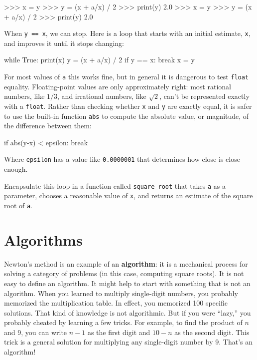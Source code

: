 \beforeverb
\begin{pyinterpreter}
>>> x = y
>>> y = (x + a/x) / 2
>>> print(y)
2.0
>>> x = y
>>> y = (x + a/x) / 2
>>> print(y)
2.0
\end{pyinterpreter}
\afterverb
%
When {\tt y == x}, we can stop.  Here is a loop that starts
with an initial estimate, {\tt x}, and improves it until it
stops changing:

\beforeverb
\begin{pycode}
while True:
    print(x)
    y = (x + a/x) / 2
    if y == x:
        break
    x = y
\end{pycode}
\afterverb
%
For most values of {\tt a} this works fine, but in general it is
dangerous to test {\tt float} equality.
Floating-point values are only approximately right:
most rational numbers, like $1/3$, and irrational numbers, like
$\sqrt{2}$, can't be represented exactly with a {\tt float}.
%
%
Rather than checking whether {\tt x} and {\tt y} are exactly equal, it
is safer to use the built-in function {\tt abs} to compute the
absolute value, or magnitude, of the difference between them:

\beforeverb
\begin{pycode}
    if abs(y-x) < epsilon:
        break
\end{pycode}
\afterverb
%
Where \verb"epsilon" has a value like {\tt 0.0000001} that
determines how close is close enough.
%
\begin{exercise}
\label{square_root}
%
{\color{red} Encapsulate} this loop in a function called \verb"square_root"
that takes {\tt a} as a parameter, chooses a reasonable
value of {\tt x}, and returns an estimate of the square root
of {\tt a}.
\end{exercise}


\section{Algorithms}

Newton's method is an example of an {\bf algorithm}: it is a
mechanical process for solving a category of problems (in this
case, computing square roots).
%
It is not easy to define an algorithm.  It might help to start
with something that is not an algorithm.  When you learned
to multiply single-digit numbers, you probably memorized the
multiplication table.  In effect, you memorized 100 specific solutions.
That kind of knowledge is not algorithmic.
%
But if you were ``lazy,'' you probably cheated by learning a few
tricks.  For example, to find the product of $n$ and 9, you can
write $n-1$ as the first digit and $10-n$ as the second
digit.  This trick is a general solution for multiplying any
single-digit number by 9.  That's an algorithm!

